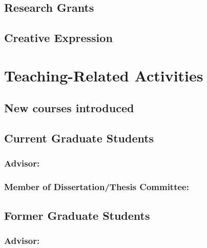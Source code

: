 \documentclass[10pt]{article}
\begin{document}
	\subsection{Research Grants}
	
\iftrue
	\subsection{Creative Expression}
	
\fi
%
%    


\iftrue
\section{Teaching-Related Activities}
	\subsection{New courses introduced}
	
	\subsection{Current Graduate Students}
    \subsubsection{Advisor:}
	\begin{enumerate}
		
    \end{enumerate}
    \subsubsection{Member of Dissertation/Thesis Committee:}
    \begin{enumerate}
    	
    \end{enumerate}
    \subsection{Former Graduate Students}
    \subsubsection{Advisor:}
    \begin{enumerate}
    	
    \end{enumerate}
\end{document}
